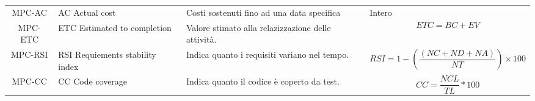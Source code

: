 \begin{table}[H]
\begin{tabular}{| c | p{3cm} | p{4cm} |p{2cm} | }
        MPC-AC                                                         & AC Actual cost                  & Costi sostenuti fino ad una data specifica                                                & Intero                                                                                  \\
        MPC-ETC                                                        & ETC Estimated to completion     & Valore stimato alla relazizzazione delle attività.                                        & \begin{equation}ETC = BC + EV       \end{equation}                                      \\
        MPC-RSI                                                        & RSI Requiements stability index & Indica quanto i requisiti variano nel tempo.                                              & \begin{equation}RSI = 1- \left( \frac{(NC + ND + NA)}{NT} \right) \times 100\end{equation} \\
        MPC-CC                                                         & CC Code coverage                & Indica quanto il codice è coperto da test.                                                & \begin{equation}CC = \frac{NCL}{TL} * 100\end{equation}                                 \\

        \hline
    \end{tabular}
\end{table}